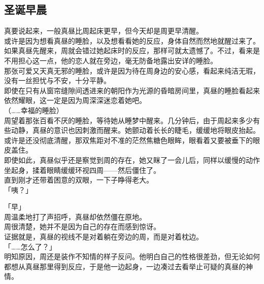 \subsection{圣诞早晨}

真要说起来，一般真昼比周起床更早，但今天却是周更早清醒。\\

或许是因为想看真昼的睡脸，以及想看看她的反应，身体自然而然地就醒过来了。\\

如果真昼先醒来，周就会错过她起床时的反应，那样可就太遗憾了。不过，看来是不用担心这一点，他的恋人就在旁边，毫无防备地露出安详的睡脸。\\

那张可爱又天真无邪的睡脸，或许是因为待在周身边的安心感，看起来纯洁无瑕，没有一丝担忧与不安，十分平静。\\

即使在只有从窗帘缝隙间透进来的朝阳作为光源的昏暗房间里，真昼的睡脸看起来依然耀眼，这一定是因为周深深迷恋着她吧。\\

（……幸福的睡脸）\\

周望着那张百看不厌的睡脸，等待她从睡梦中醒来。几分钟后，由于周起来多少有些动静，真昼的意识也因刺激而醒来。她颤动着长长的睫毛，缓缓地将眼皮抬起。\\

或许是还没彻底清醒，那双焦距对不准的茫然焦糖色眼眸，眼看着又要被垂下的眼皮盖住。\\

即使如此，真昼似乎还是察觉到周的存在，她又眯了一会儿后，同样以缓慢的动作坐起身，揉着眼睛缓缓环视四周——然后僵住了。\\

直到刚才还带着困意的双眼，一下子睁得老大。\\

「咦？」

「早」\\

周温柔地打了声招呼，真昼却依然僵在原地。\\

周很清楚，她并不是因为自己的存在而感到惊讶。\\

证据就是，真昼的视线不是对着躺在旁边的周，而是对着枕边。\\

「……怎么了？」\\

明知原因，周还是装作不知情的样子反问。他明白自己的性格很差劲，但无论如何都想从真昼那里得到反应，于是他一边起身，一边凑过去看举止可疑的真昼的神情。\\

